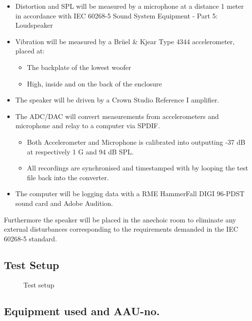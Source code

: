 \begin{itemize}
\item Distortion and \gls{SPL} will be measured by a microphone at a distance 1 meter in accordance with IEC 60268-5 Sound System Equipment - Part 5: Loudspeaker
\item Vibration will be measured by a Brüel \& Kjear Type 4344 accelerometer, placed at:
\begin{itemize}
\item The backplate of the lowest woofer
\item High, inside and on the back of the enclosure 
\end{itemize}
\item The speaker will be driven by a Crown Studio Reference I amplifier.
\item The ADC/DAC will convert measurements from accelerometers and microphone and relay to a computer via SPDIF.
\begin{itemize}
\item Both Accelerometer and Microphone is calibrated into outputting -37 dB at respectively 1 G and 94 dB \gls{SPL}.
\item All recordings are synchronised and timestamped with by looping the test file back into the converter.
\end{itemize}
\item The computer will be logging data with a RME HammerFall DIGI 96-PDST sound card and Adobe Audition.
\end{itemize}

Furthermore the speaker will be placed in the anechoic room to eliminate any external disturbances corresponding to the requirements demanded in the 
IEC 60268-5 standard.

\subsection*{Test Setup}

\begin{figure}[H]
\centering
{}

\caption{Test setup}
\label{figure:SpeakertestSetup}
\end{figure}

\subsection*{Equipment used and AAU-no.}

